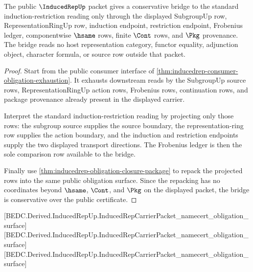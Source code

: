 \begin{theorem}
\label{thm:inducedrep-standard-bridge-scope}
The public $\InducedRepUp$ packet gives a conservative bridge to the standard induction-restriction reading only through the displayed SubgroupUp row, RepresentationRingUp row, induction endpoint, restriction endpoint, Frobenius ledger, componentwise $\hsame$ rows, finite $\Cont$ rows, and $\Pkg$ provenance. The bridge reads no host representation category, functor equality, adjunction object, character formula, or source row outside that packet.
\end{theorem}
\begin{proof}
Start from the public consumer interface of \autoref{thm:inducedrep-consumer-obligation-exhaustion}. It exhausts downstream reads by the SubgroupUp source rows, RepresentationRingUp action rows, Frobenius rows, continuation rows, and package provenance already present in the displayed carrier.

Interpret the standard induction-restriction reading by projecting only those rows: the subgroup source supplies the source boundary, the representation-ring row supplies the action boundary, and the induction and restriction endpoints supply the two displayed transport directions. The Frobenius ledger is then the sole comparison row available to the bridge.

Finally use \autoref{thm:inducedrep-obligation-closure-package} to repack the projected rows into the same public obligation surface. Since the repacking has no coordinates beyond $\hsame$, $\Cont$, and $\Pkg$ on the displayed packet, the bridge is conservative over the public certificate.
\end{proof}

[BEDC.Derived.InducedRepUp.InducedRepCarrierPacket\_namecert\_obligation\_surface]
[BEDC.Derived.InducedRepUp.InducedRepCarrierPacket\_namecert\_obligation\_surface]
[BEDC.Derived.InducedRepUp.InducedRepCarrierPacket\_namecert\_obligation\_surface]

